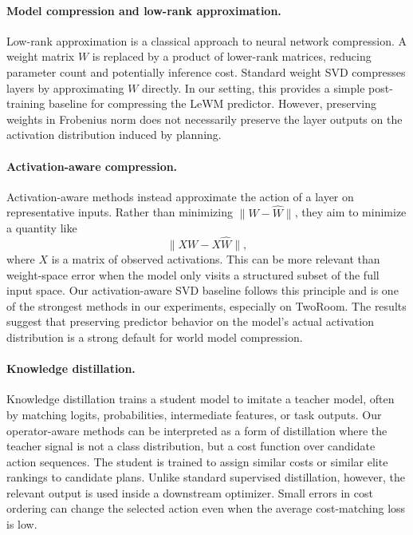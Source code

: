 \documentclass[11pt]{article}
\begin{document}
\paragraph{Model compression and low-rank approximation.}
Low-rank approximation is a classical approach to neural network compression. A weight matrix \(W\) is replaced by a product of lower-rank matrices, reducing parameter count and potentially inference cost. Standard weight SVD compresses layers by approximating \(W\) directly. In our setting, this provides a simple post-training baseline for compressing the LeWM predictor. However, preserving weights in Frobenius norm does not necessarily preserve the layer outputs on the activation distribution induced by planning.

\paragraph{Activation-aware compression.}
Activation-aware methods instead approximate the action of a layer on representative inputs. Rather than minimizing \(\|W-\widehat W\|\), they aim to minimize a quantity like
\[
    \|XW - X\widehat W\|,
\]
where \(X\) is a matrix of observed activations. This can be more relevant than weight-space error when the model only visits a structured subset of the full input space. Our activation-aware SVD baseline follows this principle and is one of the strongest methods in our experiments, especially on TwoRoom. The results suggest that preserving predictor behavior on the model's actual activation distribution is a strong default for world model compression.

\paragraph{Knowledge distillation.}
Knowledge distillation trains a student model to imitate a teacher model, often by matching logits, probabilities, intermediate features, or task outputs. Our operator-aware methods can be interpreted as a form of distillation where the teacher signal is not a class distribution, but a cost function over candidate action sequences. The student is trained to assign similar costs or similar elite rankings to candidate plans. Unlike standard supervised distillation, however, the relevant output is used inside a downstream optimizer. Small errors in cost ordering can change the selected action even when the average cost-matching loss is low.
\end{document}
